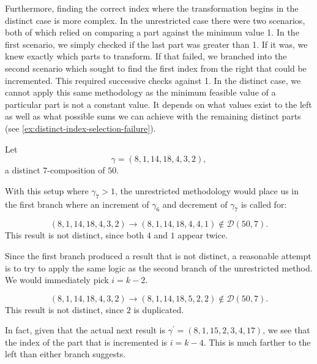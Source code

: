 Furthermore, finding the correct index where the transformation begins in the distinct case is more complex. In the unrestricted case there were two scenarios, both of which relied on comparing a part against the minimum value 1. In the first scenario, we simply checked if the last part was greater than 1. If it was, we knew exactly which parts to transform. If that failed, we branched into the second scenario which sought to find the first index from the right that could be incremented. This required successive checks against 1. In the distinct case, we cannot apply this same methodology as the minimum feasible value of a particular part is not a constant value. It depends on what values exist to the left as well as what possible sums we can achieve with the remaining distinct parts (see \cref{ex:distinct-index-selection-failure}).

\begin{example}
\label{ex:distinct-index-selection-failure}

Let
\[
    \gamma = (8, 1, 14, 18, 4, 3, 2),
\]
a distinct $7$-composition of $50$.

With this setup where $\gamma_7 > 1$, the unrestricted methodology would place us in the first branch where an increment of $\gamma_6$ and decrement of $\gamma_7$ is called for:

\[
    (8, 1, 14, 18, 4, 3, 2) \longrightarrow (8, 1, 14, 18, 4, 4, 1) \notin \mathcal{D}(50,7).
\]
This result is not distinct, since both $4$ and $1$ appear twice.

Since the first branch produced a result that is not distinct, a reasonable attempt is to try to apply the same logic as the second branch of the unrestricted method. We would immediately pick $i = k - 2$.

\[
    (8, 1, 14, 18, 4, 3, 2) \longrightarrow (8, 1, 14, 18, 5, 2, 2) \notin \mathcal{D}(50,7).
\]
This result is not distinct, since $2$ is duplicated.

In fact, given that the actual next result is $\gamma^{\prime} = (8, 1, 15, 2, 3, 4, 17)$, we see that the index of the part that is incremented is $i = k - 4$. This is much farther to the left than either branch suggests.

\end{example}

